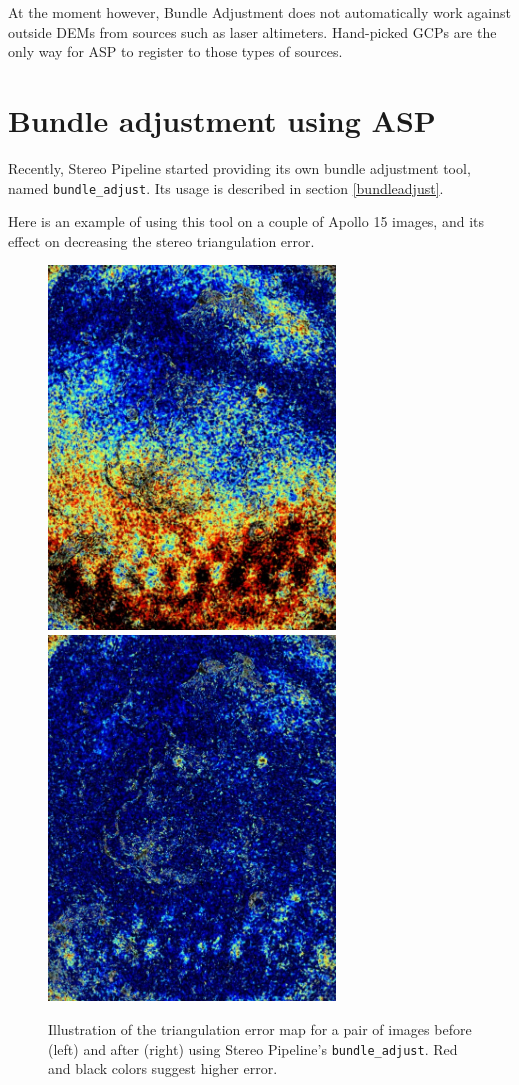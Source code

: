 At the moment however, Bundle Adjustment does not automatically work
against outside \acp{DEM} from sources such as laser altimeters.
Hand-picked \acp{GCP} are the only way for \ac{ASP} to register to those
types of sources.

\section{Bundle adjustment using ASP}
\label{baasp}

Recently, Stereo Pipeline started providing its own bundle adjustment
tool, named \texttt{bundle\_adjust}. Its usage is described in section
\ref{bundleadjust}.

Here is an example of using this tool on a couple of Apollo 15 images,
and its effect on decreasing the stereo triangulation error.

\begin{figure}[h!]
\centering
  \includegraphics[width=3.0in]{images/examples/before_ba.jpg}
  \includegraphics[width=3.0in]{images/examples/after_ba.jpg}
\caption{Illustration of the triangulation error map for a pair of
  images before (left) and after (right) using Stereo Pipeline's
  \texttt{bundle\_adjust}. Red and black colors suggest higher error.}
\label{fig:asp-ba-example}
\end{figure}

